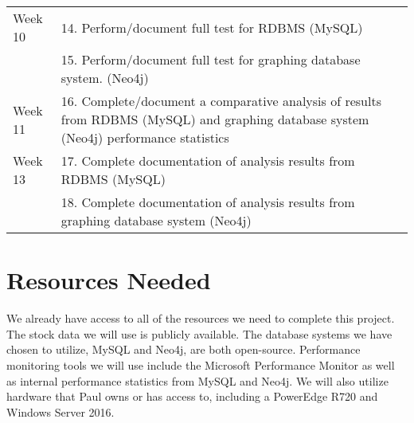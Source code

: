 \documentclass{IEEEtran}
\begin{document}
\begin{center}
\begin{tabularx}{0.5\textwidth}{|l|X|}
Week 10 & 14. Perform/document full test for RDBMS (MySQL) \\

& 15. Perform/document full test for graphing database system. (Neo4j) \\ \hline

Week 11 & 16. Complete/document a comparative analysis of results from RDBMS (MySQL) and graphing database system (Neo4j) performance statistics \\ \hline

Week 13 & 17. Complete documentation of analysis results from RDBMS (MySQL) \\

& 18. Complete documentation of analysis results from graphing database system (Neo4j) \\ \hline

\end{tabularx}
\end{center}

\section{Resources Needed}

We already have access to all of the resources we need to complete this project. The stock data we will use is publicly available. The database systems we have chosen to utilize, MySQL and Neo4j, are both open-source. Performance monitoring tools we will use include the Microsoft Performance Monitor as well as internal performance statistics from MySQL and Neo4j. We will also utilize hardware that Paul owns or has access to, including a PowerEdge R720 and Windows Server 2016.



\end{document}
